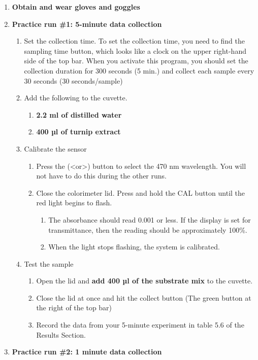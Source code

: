 \documentclass[
  letterpaper,
  DIV=11,
  numbers=noendperiod]{scrreprt}
\begin{document}
\begin{enumerate}
\def\labelenumi{\arabic{enumi})}
\item
  \textbf{Obtain and wear gloves and goggles}
\item
  \textbf{Practice run \#1: 5-minute data collection}

  \begin{enumerate}
  \def\labelenumii{\alph{enumii})}
  \item
    Set the collection time. To set the collection time, you need to
    find the sampling time button, which looks like a clock on the upper
    right-hand side of the top bar. When you activate this program, you
    should set the collection duration for 300 seconds (5 min.) and
    collect each sample every 30 seconds (30 seconds/sample)
  \item
    Add the following to the cuvette.

    \begin{enumerate}
    \def\labelenumiii{\roman{enumiii})}
    \item
      \textbf{2.2 ml of distilled water}
    \item
      \textbf{400 µl of turnip extract}
    \end{enumerate}
  \item
    Calibrate the sensor

    \begin{enumerate}
    \def\labelenumiii{\roman{enumiii})}
    \item
      Press the (\textless or\textgreater) button to select the 470 nm
      wavelength. You will not have to do this during the other runs.
    \item
      Close the colorimeter lid. Press and hold the CAL button until the
      red light begins to flash.

      \begin{enumerate}
      \def\labelenumiv{(\arabic{enumiv})}
      \item
        The absorbance should read 0.001 or less. If the display is set
        for transmittance, then the reading should be approximately
        100\%.
      \item
        When the light stops flashing, the system is calibrated.
      \end{enumerate}
    \end{enumerate}
  \item
    Test the sample

    \begin{enumerate}
    \def\labelenumiii{\roman{enumiii})}
    \item
      Open the lid and \textbf{add 400 µl of the substrate mix} to the
      cuvette.
    \item
      Close the lid at once and hit the collect button (The green button
      at the right of the top bar)
    \item
      Record the data from your 5-minute experiment in table 5.6 of the
      Results Section.
    \end{enumerate}
  \end{enumerate}
\item
  \textbf{Practice run \#2: 1 minute data collection}


\end{enumerate}
\end{document}
